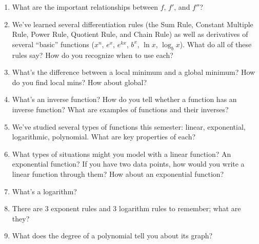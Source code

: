 \documentclass{article}
\theoremstyle{theorem}
\begin{document}
\begin{enumerate}
\item What are the important relationships between $f$, $f'$, and $f''$?

\item We've learned several differentiation rules (the Sum Rule, Constant Multiple Rule, Power Rule, Quotient Rule, and Chain Rule) as well as derivatives of several ``basic'' functions ($x^n$, $e^x$, $e^{kx}$, $b^x$, $\ln x$, $\log_b x$). What do all of these rules say? How do you recognize when to use each?

\item What's the difference between a local minimum and a global minimum? How do you find local mins? How about global?

\item What's an inverse function? How do you tell whether a function has an inverse function? What are examples of functions and their inverses? 

\item We've studied several types of functions this semester: linear, exponential, logarithmic, polynomial. What are key properties of each?

\item What types of situations might you model with a linear function? An exponential function? If you have two data points, how would you write a linear function through them? How about an exponential function? 

\item What's a logarithm?

\item There are 3 exponent rules and 3 logarithm rules to remember; what are they? 

\item What does the degree of a polynomial tell you about its graph?

\end{enumerate}
\end{document}
